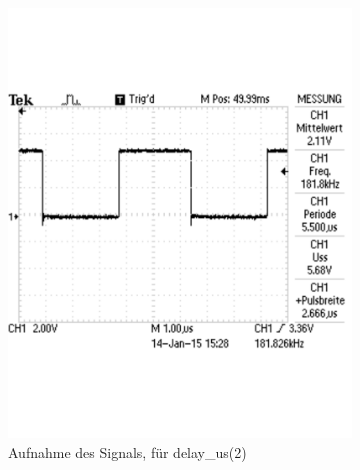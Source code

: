 \documentclass[12pt,a4paper]{article}
\begin{document}
\begin{figure}[H]
\begin{subfigure}[b]{0.28\textwidth}
   \includegraphics[trim = 0mm 50mm 0mm 50mm, clip, width=\textwidth, scale = 0.4]{TEK0009.pdf}
  \caption[Aufnahme des Signals, für delay\_us(2)]{Aufnahme des Signals, für delay\_us(2)} 
  \label{fig:g_4}
\end{subfigure}
\hfill
\begin{subfigure}[b]{0.28\textwidth} 	

\end{subfigure}
\end{figure}
\end{document}
